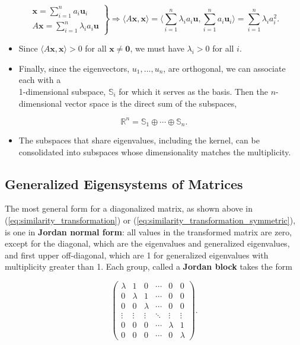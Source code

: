 \documentclass[12pt, twoside, draft]{article}
\begin{document}
\begin{equation}\label{eq:positive_definite_eigenvalues}
\left.
\begin{array}{r}
\mathbf{x} = \sum_{i=1}^n a_i \mathbf{u}_i \\
A \mathbf{x} = \sum_{i=1}^n \lambda_i a_i \mathbf{u}
\end{array}
\right\}
\Rightarrow \langle A \mathbf{x}, \mathbf{x} \rangle = \langle \sum_{i=1}^n \lambda_i a_i \mathbf{u}, \sum_{i=1}^n a_i \mathbf{u}_i \rangle = \sum_{i=1}^n \lambda_i a_i^2 .
\end{equation}
\begin{itemize}
\item[] Since $\langle A \mathbf{x}, \mathbf{x} \rangle > 0$ for all $\mathbf{x} \neq \mathbf{0}$, we must have $\lambda_i > 0$ for all $i$.
\item Finally, since the eigenvectors, $u_1, \ldots, u_n$, are orthogonal, we can associate each with a \\ 1-dimensional subspace, $\mathbb{S}_i$ for which it serves as the basis.  Then the $n$-dimensional vector space is the direct sum of the subspaces,
\end{itemize}
\begin{equation}\label{eq:eigenvector_partition_orthogonal}
\mathbb{R}^n = \mathbb{S}_1 \oplus \cdots \oplus \mathbb{S}_n.
\end{equation}
\begin{itemize}
\item[] The subspaces that share eigenvalues, including the kernel, can be consolidated into subspaces whose dimensionality matches the multiplicity.
\end{itemize}

\subsection{Generalized Eigensystems of Matrices}\label{sec:eigensystems-generalized}
The most general form for a diagonalized matrix, as shown above in (\ref{eq:similarity_transformation}) or (\ref{eq:similarity_transformation_symmetric}), is one in \textbf{Jordan normal form}:  all values in the transformed matrix are zero, except for the diagonal, which are the eigenvalues and generalized eigenvalues, and first upper off-diagonal, which are 1 for generalized eigenvalues with multiplicity greater than 1.  Each group, called a \textbf{Jordan block} takes the form

\begin{equation}\label{eq:jordan_block}
\begin{pmatrix}
\lambda & 1 & 0 & \cdots & 0 & 0 \\
0 & \lambda & 1 & \cdots & 0 & 0 \\
0 & 0 & \lambda & \cdots & 0 & 0 \\
\vdots & \vdots & \vdots & \ddots & \vdots & \vdots \\
0 & 0 & 0 & \cdots & \lambda & 1 \\
0 & 0 & 0 & \cdots & 0 & \lambda 
\end{pmatrix} .
\end{equation}
\end{document}
